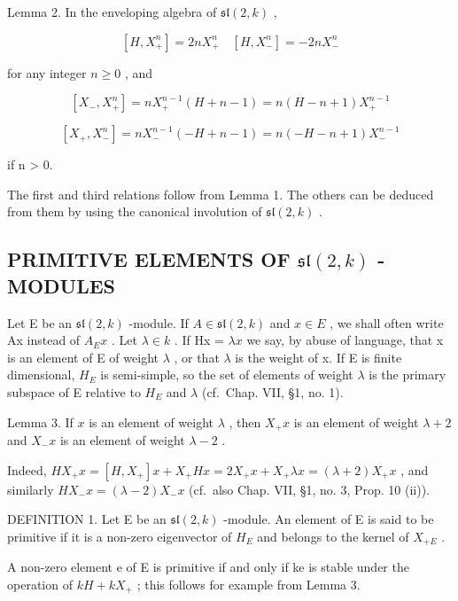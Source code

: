 Lemma 2. In the enveloping algebra of \(\mathfrak{sl}(2,k)\) ,

\[
[ H, X _ {+} ^ {n} ] = 2 n X _ {+} ^ {n} \quad [ H, X _ {-} ^ {n} ] = - 2 n X _ {-} ^ {n}
\]

for any integer \(n \geq 0\) , and

\[
[ X _ {-}, X _ {+} ^ {n} ] = n X _ {+} ^ {n - 1} (H + n - 1) = n (H - n + 1) X _ {+} ^ {n - 1}
\]

\[
[ X _ {+}, X _ {-} ^ {n} ] = n X _ {-} ^ {n - 1} (- H + n - 1) = n (- H - n + 1) X _ {-} ^ {n - 1}
\]

if n \textgreater{} 0.

The first and third relations follow from Lemma 1. The others can be deduced from them by using the canonical involution of \(\mathfrak{sl}(2,k)\) .

\subsection{\texorpdfstring{PRIMITIVE ELEMENTS OF \(\mathfrak{sl}(2,k)\) -MODULES}{PRIMITIVE ELEMENTS OF \textbackslash mathfrak\{sl\}(2,k) -MODULES}}

Let E be an \(\mathfrak{sl}(2,k)\) -module. If \(A \in \mathfrak{sl}(2,k)\) and \(x \in E\) , we shall often write Ax instead of \(A_{E}x\) . Let \(\lambda \in k\) . If Hx = \(\lambda x\) we say, by abuse of language, that x is an element of E of weight \(\lambda\) , or that \(\lambda\) is the weight of x. If E is finite dimensional, \(H_{E}\) is semi-simple, so the set of elements of weight \(\lambda\) is the primary subspace of E relative to \(H_{E}\) and \(\lambda\) (cf.~Chap. VII, §1, no. 1).

Lemma 3. If \(x\) is an element of weight \(\lambda\) , then \(X_{+}x\) is an element of weight \(\lambda + 2\) and \(X_{-}x\) is an element of weight \(\lambda - 2\) .

Indeed, \(HX_{+}x = [H,X_{+}]x + X_{+}Hx = 2X_{+}x + X_{+}\lambda x = (\lambda +2)X_{+}x\) , and similarly \(HX_{-}x = (\lambda -2)X_{-}x\) (cf.~also Chap. VII, §1, no. 3, Prop. 10 (ii)).

DEFINITION 1. Let E be an \(\mathfrak{sl}(2,k)\) -module. An element of E is said to be primitive if it is a non-zero eigenvector of \(H_{E}\) and belongs to the kernel of \(X_{+E}\) .

A non-zero element e of E is primitive if and only if ke is stable under the operation of \(kH + kX_{+}\) ; this follows for example from Lemma 3.

